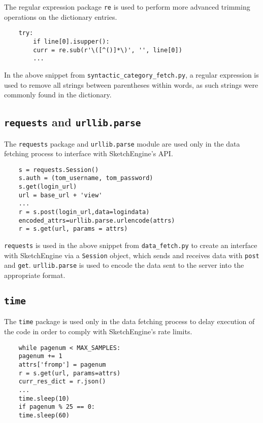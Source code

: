 \documentclass{article}      %
\begin{document}
	The regular expression package \texttt{re} is used to perform more advanced trimming operations on the dictionary entries.
	
	\begin{verbatim}
	try:
		if line[0].isupper():
		curr = re.sub(r'\([^()]*\)', '', line[0])
		...
	\end{verbatim}
	
	In the above snippet from \texttt{syntactic\_category\_fetch.py}, a regular expression is used to remove all strings between parentheses within words, as such strings were commonly found in the dictionary.
	
	\subsection{\texttt{requests} and \texttt{urllib.parse}}
	
	The \texttt{requests} package and \texttt{urllib.parse} module are used only in the data fetching process to interface with SketchEngine's API.
	
	\begin{verbatim}
	s = requests.Session()
	s.auth = (tom_username, tom_password)
	s.get(login_url)
	url = base_url + 'view'
	...
	r = s.post(login_url,data=logindata)
	encoded_attrs=urllib.parse.urlencode(attrs)
	r = s.get(url, params = attrs)
	\end{verbatim}
	
	\texttt{requests} is used in the above snippet from \texttt{data\_fetch.py} to create an interface with SketchEngine via a \texttt{Session} object, which sends and receives data with \texttt{post} and \texttt{get}. \texttt{urllib.parse} is used to encode the data sent to the server into the appropriate format.
	
	\subsection{\texttt{time}}
	
	The \texttt{time} package is used only in the data fetching process to delay execution of the code in order to comply with SketchEngine's rate limits.
	
	\begin{verbatim}
	while pagenum < MAX_SAMPLES:
	pagenum += 1
	attrs['fromp'] = pagenum
	r = s.get(url, params=attrs)
	curr_res_dict = r.json()
	...	
	time.sleep(10)
	if pagenum % 25 == 0:
	time.sleep(60)
	\end{verbatim}
	
\end{document}
